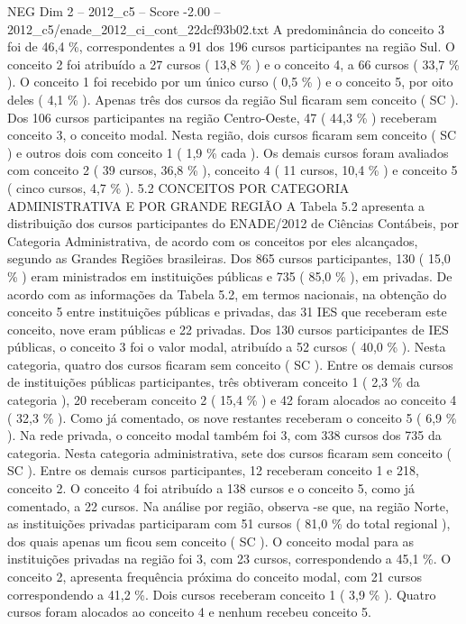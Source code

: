 \begin{textsample}{NEG Dim 2 – 2012\_c5 – Score -2.00 – 2012\_c5/enade\_2012\_ci\_cont\_22dcf93b02.txt}
A predominância do conceito 3 foi de 46,4 \%, correspondentes a 91 dos 196 cursos participantes na região Sul.
O conceito 2 foi atribuído a 27 cursos ( 13,8 \% ) e o conceito 4, a 66 cursos ( 33,7 \% ).
O conceito 1 foi recebido por um único curso ( 0,5 \% ) e o conceito 5, por oito deles ( 4,1 \% ).
Apenas três dos cursos da região Sul ficaram sem conceito ( SC ).
Dos 106 cursos participantes na região Centro-Oeste, 47 ( 44,3 \% ) receberam conceito 3, o conceito modal.
Nesta região, dois cursos ficaram sem conceito ( SC ) e outros dois com conceito 1 ( 1,9 \% cada ).
Os demais cursos foram avaliados com conceito 2 ( 39 cursos, 36,8 \% ), conceito 4 ( 11 cursos, 10,4 \% ) e conceito 5 ( cinco cursos, 4,7 \% ). 5.2 CONCEITOS POR CATEGORIA ADMINISTRATIVA E POR GRANDE REGIÃO A Tabela 5.2 apresenta a distribuição dos cursos participantes do ENADE/2012 de Ciências Contábeis, por Categoria Administrativa, de acordo com os conceitos por eles alcançados, segundo as Grandes Regiões brasileiras.
Dos 865 cursos participantes, 130 ( 15,0 \% ) eram ministrados em instituições públicas e 735 ( 85,0 \% ), em privadas.
De acordo com as informações da Tabela 5.2, em termos nacionais, na obtenção do conceito 5 entre instituições públicas e privadas, das 31 IES que receberam este conceito, nove eram públicas e 22 privadas.
Dos 130 cursos participantes de IES públicas, o conceito 3 foi o valor modal, atribuído a 52 cursos ( 40,0 \% ).
Nesta categoria, quatro dos cursos ficaram sem conceito ( SC ).
Entre os demais cursos de instituições públicas participantes, três obtiveram conceito 1 ( 2,3 \% da categoria ), 20 receberam conceito 2 ( 15,4 \% ) e 42 foram alocados ao conceito 4 ( 32,3 \% ).
Como já comentado, os nove restantes receberam o conceito 5 ( 6,9 \% ).
Na rede privada, o conceito modal também foi 3, com 338 cursos dos 735 da categoria.
Nesta categoria administrativa, sete dos cursos ficaram sem conceito ( SC ).
Entre os demais cursos participantes, 12 receberam conceito 1 e 218, conceito 2.
O conceito 4 foi atribuído a 138 cursos e o conceito 5, como já comentado, a 22 cursos.
Na análise por região, observa -se que, na região Norte, as instituições privadas participaram com 51 cursos ( 81,0 \% do total regional ), dos quais apenas um ficou sem conceito ( SC ).
O conceito modal para as instituições privadas na região foi 3, com 23 cursos, correspondendo a 45,1 \%.
O conceito 2, apresenta frequência próxima do conceito modal, com 21 cursos correspondendo a 41,2 \%.
Dois cursos receberam conceito 1 ( 3,9 \% ).
Quatro cursos foram alocados ao conceito 4 e nenhum recebeu conceito 5.

\end{textsample}
